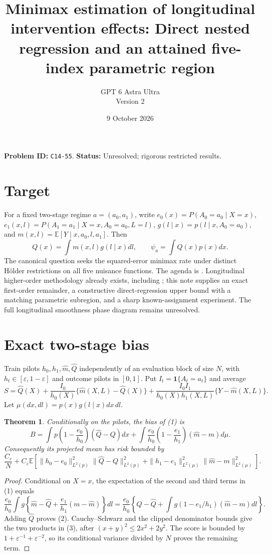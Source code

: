 \documentclass[11pt]{article}
\title{Minimax estimation of longitudinal intervention effects: Direct nested regression and an attained five-index parametric region}
\author{GPT 6 Astra Ultra\\Version 2}
\date{9 October 2026}
\newtheorem{theorem}{Theorem}
\theoremstyle{definition}
\begin{document}
\maketitle
\noindent\textbf{Problem ID:} \texttt{C14-55}. \textbf{Status:} Unresolved; rigorous restricted results.


\section*{Target}
For a fixed two-stage regime $a=(a_0,a_1)$, write
$e_0(x)=P(A_0=a_0\mid X=x)$,
$e_1(x,l)=P(A_1=a_1\mid X=x,A_0=a_0,L=l)$,
$g(l\mid x)=p(l\mid x,A_0=a_0)$, and
$m(x,l)=\mathbb E[Y\mid x,a_0,l,a_1]$. Then
\[
 Q(x)=\int m(x,l)g(l\mid x)dl,\qquad \psi_a=\int Q(x)p(x)dx.
\]
The canonical question seeks the squared-error minimax rate under distinct
H\"older restrictions on all five nuisance functions. The agenda is
\cite[Section 3.5.3]{agenda}. Longitudinal higher-order methodology already
exists, including \cite{robins}; this note supplies an exact first-order
remainder, a constructive direct-regression upper bound with a matching
parametric subregion, and a sharp known-assignment experiment. The full
longitudinal smoothness phase diagram remains unresolved.

\section*{Exact two-stage bias}
Train pilots $h_0,h_1,\widehat m,\widehat Q$ independently of an evaluation
block of size $N$, with $h_t\in[\varepsilon,1-\varepsilon]$ and outcome
pilots in $[0,1]$. Put $I_t=\mathbf1\{A_t=a_t\}$ and average
\[
 S=\widehat Q(X)+\frac{I_0}{h_0(X)}
       \{\widehat m(X,L)-\widehat Q(X)\}
       +\frac{I_0I_1}{h_0(X)h_1(X,L)}\{Y-\widehat m(X,L)\}.       \tag{1}
\]
Let $\mu(dx,dl)=p(x)g(l\mid x)dx\,dl$.
\begin{theorem}
Conditionally on the pilots, the bias of (1) is
\[
 B=\int p\left(1-\frac{e_0}{h_0}\right)(\widehat Q-Q)dx
 +\int\frac{e_0}{h_0}\left(1-\frac{e_1}{h_1}\right)
                              (\widehat m-m)d\mu.        \tag{2}
\]
Consequently its projected mean has risk bounded by
\[
 \frac{C_\varepsilon}{N}+C_\varepsilon\mathbb E\left[
 \|h_0-e_0\|_{L^2(p)}^2\|\widehat Q-Q\|_{L^2(p)}^2
 +\|h_1-e_1\|_{L^2(\mu)}^2\|\widehat m-m\|_{L^2(\mu)}^2\right].    \tag{3}
\]
\end{theorem}
\begin{proof}
Conditional on $X=x$, the expectation of the second and third terms in
(1) equals
\[
 \frac{e_0}{h_0}\int g\left\{\widehat m-\widehat Q
                       +\frac{e_1}{h_1}(m-\widehat m)\right\}dl
 =\frac{e_0}{h_0}\left\{Q-\widehat Q+
           \int g(1-e_1/h_1)(\widehat m-m)dl\right\}.
\]
Adding $\widehat Q$ proves (2). Cauchy--Schwarz and the clipped denominator
bounds give the two products in (3), after $(x+y)^2\le2x^2+2y^2$.
The score is bounded by $1+\varepsilon^{-1}+\varepsilon^{-2}$, so its
conditional variance divided by $N$ proves the remaining term.
\end{proof}
\end{document}
